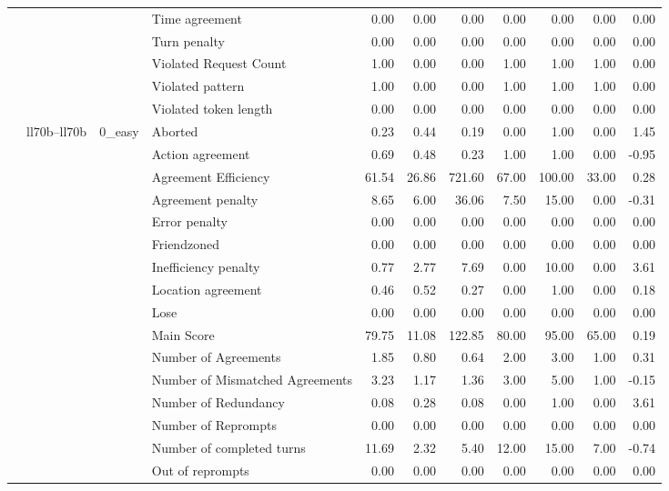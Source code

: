 \begin{tabular}{llllrrrrrrr}
 &  &  & Time agreement & 0.00 & 0.00 & 0.00 & 0.00 & 0.00 & 0.00 & 0.00 \\
 &  &  & Turn penalty & 0.00 & 0.00 & 0.00 & 0.00 & 0.00 & 0.00 & 0.00 \\
 &  &  & Violated Request Count & 1.00 & 0.00 & 0.00 & 1.00 & 1.00 & 1.00 & 0.00 \\
 &  &  & Violated pattern & 1.00 & 0.00 & 0.00 & 1.00 & 1.00 & 1.00 & 0.00 \\
 &  &  & Violated token length & 0.00 & 0.00 & 0.00 & 0.00 & 0.00 & 0.00 & 0.00 \\
\cline{2-11} \cline{3-11}
 & \multirow[t]{378}{*}{ll70b--ll70b} & \multirow[t]{27}{*}{0_easy} & Aborted & 0.23 & 0.44 & 0.19 & 0.00 & 1.00 & 0.00 & 1.45 \\
 &  &  & Action agreement & 0.69 & 0.48 & 0.23 & 1.00 & 1.00 & 0.00 & -0.95 \\
 &  &  & Agreement Efficiency & 61.54 & 26.86 & 721.60 & 67.00 & 100.00 & 33.00 & 0.28 \\
 &  &  & Agreement penalty & 8.65 & 6.00 & 36.06 & 7.50 & 15.00 & 0.00 & -0.31 \\
 &  &  & Error penalty & 0.00 & 0.00 & 0.00 & 0.00 & 0.00 & 0.00 & 0.00 \\
 &  &  & Friendzoned & 0.00 & 0.00 & 0.00 & 0.00 & 0.00 & 0.00 & 0.00 \\
 &  &  & Inefficiency penalty & 0.77 & 2.77 & 7.69 & 0.00 & 10.00 & 0.00 & 3.61 \\
 &  &  & Location agreement & 0.46 & 0.52 & 0.27 & 0.00 & 1.00 & 0.00 & 0.18 \\
 &  &  & Lose & 0.00 & 0.00 & 0.00 & 0.00 & 0.00 & 0.00 & 0.00 \\
 &  &  & Main Score & 79.75 & 11.08 & 122.85 & 80.00 & 95.00 & 65.00 & 0.19 \\
 &  &  & Number of Agreements & 1.85 & 0.80 & 0.64 & 2.00 & 3.00 & 1.00 & 0.31 \\
 &  &  & Number of Mismatched Agreements & 3.23 & 1.17 & 1.36 & 3.00 & 5.00 & 1.00 & -0.15 \\
 &  &  & Number of Redundancy & 0.08 & 0.28 & 0.08 & 0.00 & 1.00 & 0.00 & 3.61 \\
 &  &  & Number of Reprompts & 0.00 & 0.00 & 0.00 & 0.00 & 0.00 & 0.00 & 0.00 \\
 &  &  & Number of completed turns & 11.69 & 2.32 & 5.40 & 12.00 & 15.00 & 7.00 & -0.74 \\
 &  &  & Out of reprompts & 0.00 & 0.00 & 0.00 & 0.00 & 0.00 & 0.00 & 0.00 \\

\end{tabular}
